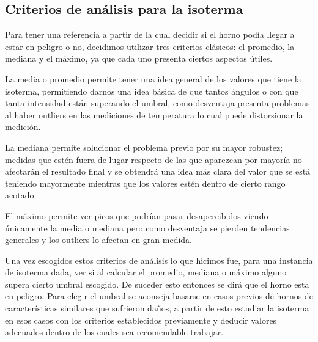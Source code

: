 


\subsection{Criterios de análisis para la isoterma}
 Para tener una referencia a partir de la cual decidir si el horno podía llegar a estar en peligro o no, decidimos utilizar tres criterios clásicos: el promedio, la mediana y el máximo, ya que cada uno presenta ciertos aspectos útiles.
 
  La media o promedio permite tener una idea general de los valores que tiene la isoterma, permitiendo darnos una idea básica de que tantos ángulos o con que tanta intensidad están superando el umbral, como desventaja presenta problemas al haber outliers en las mediciones de temperatura lo cual puede distorsionar la medición.
 
  La mediana permite solucionar el problema previo por su mayor robustez; medidas que estén fuera de lugar respecto de las que aparezcan por mayoría no afectarán el resultado final y se obtendrá una idea más clara del valor que se está teniendo mayormente mientras que los valores estén dentro de cierto rango acotado.
  
   El máximo permite ver picos que podrían pasar desapercibidos viendo únicamente la media o mediana pero como desventaja se pierden tendencias generales y los outliers lo afectan en gran medida.

Una vez escogidos estos criterios de análisis lo que hicimos fue, para una instancia de isoterma dada, ver si al calcular el promedio, mediana o máximo alguno supera cierto umbral escogido. De suceder esto entonces se dirá que el horno esta en peligro. Para elegir el umbral se aconseja basarse en casos previos de hornos de características similares que sufrieron daños, a partir de esto estudiar la isoterma en esos casos con los criterios establecidos previamente y deducir valores adecuados dentro de los cuales sea recomendable trabajar.

